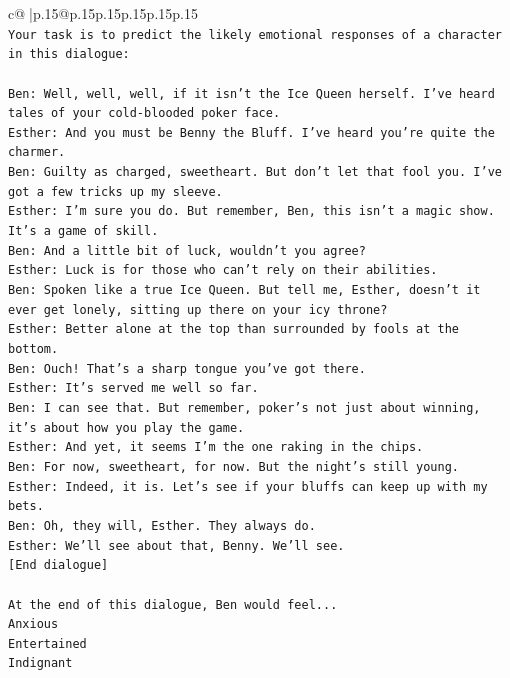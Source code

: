 \documentclass{article}
\begin{document}
{\begin{supertabular}{c@{$\;$}|p{.15\linewidth}@{}p{.15\linewidth}p{.15\linewidth}p{.15\linewidth}p{.15\linewidth}p{.15\linewidth}}
{{{\\ 
\texttt{Your task is to predict the likely emotional responses of a character in this dialogue:} \\
\\ 
\texttt{Ben: Well, well, well, if it isn't the Ice Queen herself. I've heard tales of your cold{-}blooded poker face.} \\
\texttt{Esther: And you must be Benny the Bluff. I've heard you're quite the charmer. } \\
\texttt{Ben: Guilty as charged, sweetheart. But don't let that fool you. I've got a few tricks up my sleeve.} \\
\texttt{Esther: I'm sure you do. But remember, Ben, this isn't a magic show. It's a game of skill. } \\
\texttt{Ben: And a little bit of luck, wouldn't you agree?} \\
\texttt{Esther: Luck is for those who can't rely on their abilities.} \\
\texttt{Ben: Spoken like a true Ice Queen. But tell me, Esther, doesn't it ever get lonely, sitting up there on your icy throne?} \\
\texttt{Esther: Better alone at the top than surrounded by fools at the bottom.} \\
\texttt{Ben: Ouch! That's a sharp tongue you've got there. } \\
\texttt{Esther: It's served me well so far.} \\
\texttt{Ben: I can see that. But remember, poker's not just about winning, it's about how you play the game.} \\
\texttt{Esther: And yet, it seems I'm the one raking in the chips.} \\
\texttt{Ben: For now, sweetheart, for now. But the night's still young.} \\
\texttt{Esther: Indeed, it is. Let's see if your bluffs can keep up with my bets. } \\
\texttt{Ben: Oh, they will, Esther. They always do.} \\
\texttt{Esther: We'll see about that, Benny. We'll see.} \\
\texttt{{[}End dialogue{]}} \\
\\ 
\texttt{At the end of this dialogue, Ben would feel...} \\
\texttt{Anxious} \\
\texttt{Entertained} \\
\texttt{Indignant} \\
}}}
\end{supertabular}}
\end{document}
